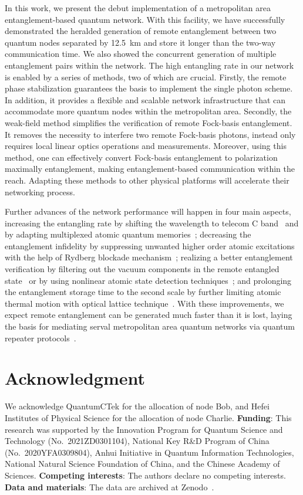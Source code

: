 \documentclass[aps,reprint,showpacs,superscriptaddress]{revtex4-2}
\begin{document}
In this work, we present the debut implementation of a metropolitan area entanglement-based quantum network. With this facility, we have successfully demonstrated the heralded generation of remote entanglement between two quantum nodes separated by 12.5~km and store it longer than the two-way communication time. We also showed the concurrent generation of multiple entanglement pairs within the network. The high entangling rate in our network is enabled by a series of methods, two of which are crucial. Firstly, the remote phase stabilization guarantees the basis to implement the single photon scheme. In addition, it provides a flexible and scalable network infrastructure that can accommodate more quantum nodes within the metropolitan area. Secondly, the weak-field method simplifies the verification of remote Fock-basis entanglement. It removes the necessity to interfere two remote Fock-basis photons, instead only requires local linear optics operations and measurements. Moreover, using this method, one can effectively convert Fock-basis entanglement to polarization maximally entanglement, making entanglement-based communication within the reach. Adapting these methods to other physical platforms will accelerate their networking process.

Further advances of the network performance will happen in four main aspects, increasing the entangling rate by shifting the wavelength to telecom C band~\cite{vanleent2020,vanleent2022} and by adapting multiplexed atomic quantum memories~\cite{collins2007,pu2017,parniak2017}; decreasing the entanglement infidelity by suppressing unwanted higher order atomic excitations with the help of Rydberg blockade mechanism~\cite{li2013,sun2022}; realizing a better entanglement verification by filtering out the vacuum components in the remote entangled state~\cite{duan2001,chou2007} or by using nonlinear atomic state detection techniques~\cite{xu2021,yang2022d}; and prolonging the entanglement storage time to the second scale by further limiting atomic thermal motion with optical lattice technique~\cite{yang2016,wang2021e}. With these improvements, we expect remote entanglement can be generated much faster than it is lost, laying the basis for mediating serval metropolitan area quantum networks via quantum repeater protocols~\cite{briegel1998,sangouard2011}.

\section*{Acknowledgment}
We acknowledge QuantumCTek for the allocation of node Bob, and Hefei Institutes of Physical Science for the allocation of node Charlie. \textbf{Funding}: This research was supported by the Innovation Program for Quantum Science and Technology (No.~2021ZD0301104), National Key R\&D Program of China (No.~2020YFA0309804), Anhui Initiative in Quantum Information Technologies, National Natural Science Foundation of China, and the Chinese Academy of Sciences. \textbf{Competing interests}: The authors declare no competing interests. \textbf{Data and materials}: The data are archived at Zenodo~\cite{dataset}.
\end{document}
